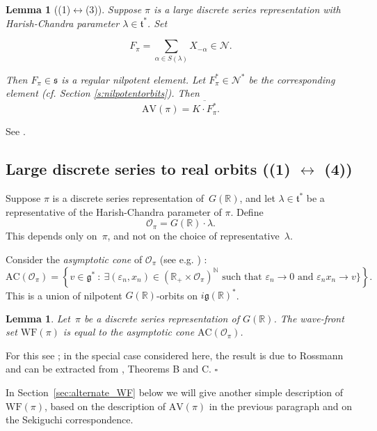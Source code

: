 \documentclass[10pt,leqno]{article}
\newtheorem{lemma}[equation]{Lemma}
\numberwithin{equation}{section}
\newcommand{\qed}{\hfill $\square$ \medskip}
\newcommand{\R}{\mathbb R}
\newcommand{\N}{\mathcal N}
\renewcommand{\t}{\mathfrak t}
\newcommand{\g}{\mathfrak g}
\newcommand{\s}{\mathfrak s}
\newcommand{\AV}{\mathrm{AV}}
\newcommand{\WF}{\mathrm{WF}}
\newcommand{\AC}{\mathrm{AC}}
\begin{document}
\begin{lemma}[(1)$\leftrightarrow$(3)]\label{l:pi_to_av}
Suppose $\pi$ is a large discrete series representation with Harish-Chandra parameter $\lambda\in\t^*$.
Set

\begin{equation}
  \label{e:Fpi}
  F_\pi=\sum_{\alpha\in S(\lambda)}X_{-\alpha}\in \N.
\end{equation}

Then $F_\pi\in\s$ is a regular nilpotent element. Let $F_\pi^\ast\in \N^*$ be the corresponding element (cf. Section \ref{s:nilpotentorbits}).
Then 
$$
\AV(\pi)=\overline{K\cdot F_\pi^\ast}.
$$
\end{lemma}
See
\cite[Propositions A.7 and A.9]{AV1}.


\subsection{Large discrete series to real orbits ((1) $\leftrightarrow$ (4))}\label{sec:asymp_cone}


Suppose $\pi$ is a discrete series representation of~$G(\R)$, and let $\lambda\in\t^*$ be a representative of the Harish-Chandra parameter of $\pi$.
Define
\begin{equation} \label{semisimple_orbit_HC} \mathcal{O}_{\pi}=G(\R)\cdot\lambda.\end{equation}
This depends only on~$\pi$, and not on the choice of representative~$\lambda$. 

Consider the \emph{asymptotic cone} of $\mathcal{O}_\pi$ (see e.g. \cite[Section 3]{AVAV}) :
\[ \AC(\mathcal{O}_\pi) = \left\{ v \in \g^* \ : \ \text{$\exists (\varepsilon_n, x_n)\in (\R_+ \times \mathcal{O}_\pi)^\mathbb{N}$ such that $\varepsilon_n \to 0$ and $\varepsilon_n x_n \to v$}\}  \right\}. \]
This is a union of nilpotent $G(\R)$-orbits on $i\g(\R)^*$.

\begin{lemma} \label{lem:WF_and_AC}
Let~$\pi$ be a discrete series representation of $G(\R)$. The wave-front set $\WF(\pi)$ is equal to the asymptotic cone $\AC(\mathcal{O}_\pi)$.
\end{lemma}

For this see \cite{HarrisHeOlafsson}; in the special case considered here, the result is due to Rossmann and can be extracted from \cite{RossmannPicard}, Theorems B and C. \qed

In Section~\ref{sec:alternate_WF} below we will  give another simple description of~$\WF(\pi)$, based on the description of $\AV(\pi)$ in the previous paragraph and on the Sekiguchi correspondence. 
\end{document}
